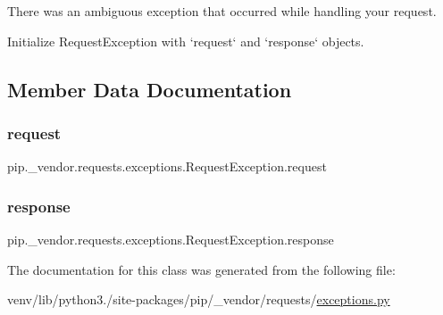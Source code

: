 \begin{DoxyVerb}There was an ambiguous exception that occurred while handling your
request.
\end{DoxyVerb}
\begin{DoxyVerb}Initialize RequestException with `request` and `response` objects.\end{DoxyVerb}
 

\subsection{Member Data Documentation}
\mbox{\label{classpip_1_1__vendor_1_1requests_1_1exceptions_1_1RequestException_a68a0b2dcf4804bbd26c9b61ae90e34a2}} 
\subsubsection{\texorpdfstring{request}{request}}
{\footnotesize\ttfamily pip.\+\_\+vendor.\+requests.\+exceptions.\+Request\+Exception.\+request}

\mbox{\label{classpip_1_1__vendor_1_1requests_1_1exceptions_1_1RequestException_a0e345d98e65e24f94ef4336d2c6384d2}} 
\subsubsection{\texorpdfstring{response}{response}}
{\footnotesize\ttfamily pip.\+\_\+vendor.\+requests.\+exceptions.\+Request\+Exception.\+response}



The documentation for this class was generated from the following file\+:\begin{DoxyCompactItemize}
\item 
venv/lib/python3./site-\/packages/pip/\+\_\+vendor/requests/\hyperlink{pip_2__vendor_2requests_2exceptions_8py}{exceptions.\+py}\end{DoxyCompactItemize}
